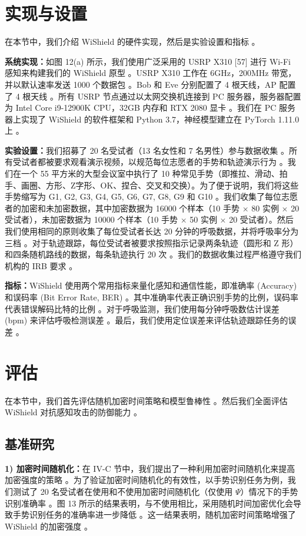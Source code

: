 \documentclass[journal]{IEEEtran}
\begin{document}
\section{实现与设置}
在本节中，我们介绍 WiShield 的硬件实现，然后是实验设置和指标 。

\textbf{系统实现：}如图 12(a) 所示，我们使用广泛采用的 USRP X310 [57] 进行 Wi-Fi 感知来构建我们的 WiShield 原型 。USRP X310 工作在 6GHz，200MHz 带宽，并以默认速率发送 1000 个数据包 。Bob 和 Eve 分别配置了 4 根天线，AP 配置了 4 根天线 。所有 USRP 节点通过以太网交换机连接到 PC 服务器，服务器配置为 Intel Core i9-12900K CPU，32GB 内存和 RTX 2080 显卡 。我们在 PC 服务器上实现了 WiShield 的软件框架和 Python 3.7，神经模型建立在 PyTorch 1.11.0 上 。

\textbf{实验设置：}我们招募了 20 名受试者（13 名女性和 7 名男性）参与数据收集 。所有受试者都被要求观看演示视频，以规范每位志愿者的手势和轨迹演示行为 。我们在一个 55 平方米的大型会议室中执行了 10 种常见手势（即推拉、滑动、拍手、画圈、方形、Z字形、OK、捏合、交叉和交换）。为了便于说明，我们将这些手势缩写为 G1, G2, G3, G4, G5, G6, G7, G8, G9 和 G10 。我们收集了每位志愿者的加密和未加密数据，其中加密数据为 16000 个样本（10 手势 $\times$ 80 实例 $\times$ 20 受试者），未加密数据为 10000 个样本（10 手势 $\times$ 50 实例 $\times$ 20 受试者）。然后我们使用相同的原则收集了每位受试者长达 20 分钟的呼吸数据，并将呼吸率分为三档 。对于轨迹跟踪，每位受试者被要求按照指示记录两条轨迹（圆形和 Z 形）和四条随机路线的数据，每条轨迹执行 20 次 。我们的数据收集过程严格遵守我们机构的 IRB 要求 。

\textbf{指标：}WiShield 使用两个常用指标来量化感知和通信性能，即准确率 (Accuracy) 和误码率 (Bit Error Rate, BER) 。其中准确率代表正确识别手势的比例，误码率代表错误解码比特的比例 。对于呼吸监测，我们使用每分钟呼吸数估计误差 (bpm) 来评估呼吸检测误差 。最后，我们使用定位误差来评估轨迹跟踪任务的误差 。

\section{评估}
在本节中，我们首先评估随机加密时间策略和模型鲁棒性 。然后我们全面评估 WiShield 对抗感知攻击的防御能力 。

\subsection{基准研究}
\textbf{1) 加密时间随机化：}在 IV-C 节中，我们提出了一种利用加密时间随机化来提高加密强度的策略 。为了验证加密时间随机化的有效性，以手势识别任务为例，我们测试了 20 名受试者在使用和不使用加密时间随机化（仅使用 $\Psi$）情况下的手势识别准确率 。图 13 所示的结果表明，与不使用相比，采用随机时间加密优化会导致手势识别任务的准确率进一步降低 。这一结果表明，随机加密时间策略增强了 WiShield 的加密强度 。
\end{document}

